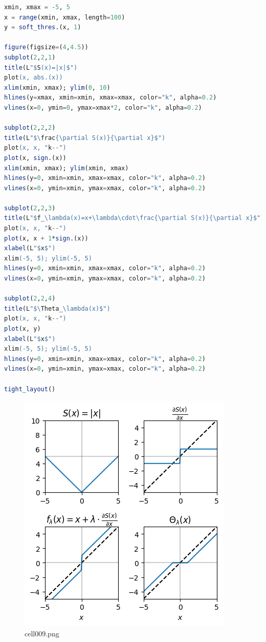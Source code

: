 \begin{lstlisting}[language=julia]
xmin, xmax = -5, 5
x = range(xmin, xmax, length=100)
y = soft_thres.(x, 1)

figure(figsize=(4,4.5))
subplot(2,2,1)
title(L"$S(x)=|x|$")
plot(x, abs.(x))
xlim(xmin, xmax); ylim(0, 10)
hlines(y=xmax, xmin=xmin, xmax=xmax, color="k", alpha=0.2)
vlines(x=0, ymin=0, ymax=xmax*2, color="k", alpha=0.2)

subplot(2,2,2)
title(L"$\frac{\partial S(x)}{\partial x}$")
plot(x, x, "k--")
plot(x, sign.(x))
xlim(xmin, xmax); ylim(xmin, xmax)
hlines(y=0, xmin=xmin, xmax=xmax, color="k", alpha=0.2)
vlines(x=0, ymin=xmin, ymax=xmax, color="k", alpha=0.2)

subplot(2,2,3)
title(L"$f_\lambda(x)=x+\lambda\cdot\frac{\partial S(x)}{\partial x}$")
plot(x, x, "k--")
plot(x, x + 1*sign.(x))
xlabel(L"$x$")
xlim(-5, 5); ylim(-5, 5)
hlines(y=0, xmin=xmin, xmax=xmax, color="k", alpha=0.2)
vlines(x=0, ymin=xmin, ymax=xmax, color="k", alpha=0.2)

subplot(2,2,4)
title(L"$\Theta_\lambda(x)$")
plot(x, x, "k--")
plot(x, y)
xlabel(L"$x$")
xlim(-5, 5); ylim(-5, 5)
hlines(y=0, xmin=xmin, xmax=xmax, color="k", alpha=0.2)
vlines(x=0, ymin=xmin, ymax=xmax, color="k", alpha=0.2)

tight_layout()
\end{lstlisting}
\begin{figure}[ht]
	\centering
	\includegraphics[scale=0.8, max width=\linewidth]{./fig/energy-based-model/sparse-coding/cell009.png}
	\caption{cell009.png}
	\label{cell009.png}
\end{figure}
